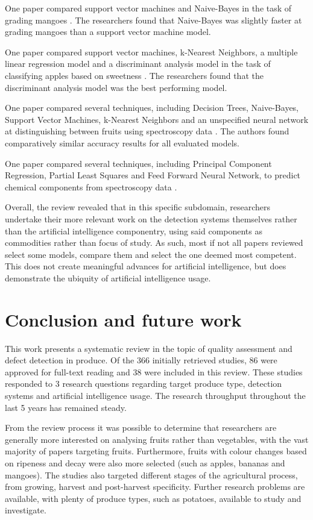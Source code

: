 \documentclass[conference]{IEEEtran}
\begin{document}
One paper compared support vector machines and Naive-Bayes in the task of grading mangoes \cite{Pise2018}. The researchers found that Naive-Bayes was slightly faster at grading mangoes than a support vector machine model.

One paper compared support vector machines, k-Nearest Neighbors, a multiple linear regression model and a discriminant analysis model in the task of classifying apples based on sweetness \cite{Tran2021}. The researchers found that the discriminant analysis model was the best performing model.

One paper compared several techniques, including Decision Trees, Naive-Bayes, Support Vector Machines, k-Nearest Neighbors and an unspecified neural network at distinguishing between fruits using spectroscopy data \cite{Zeb2022}. The authors found comparatively similar accuracy results for all evaluated models.

One paper compared several techniques, including Principal Component Regression, Partial Least Squares and Feed Forward Neural Network, to predict chemical components from spectroscopy data \cite{Rangel2021}.

Overall, the review revealed that in this specific subdomain, researchers undertake their more relevant work on the detection systems themselves rather than the artificial intelligence componentry, using said components as commodities rather than focus of study. As such, most if not all papers reviewed select some models, compare them and select the one deemed most competent. This does not create meaningful advances for artificial intelligence, but does demonstrate the ubiquity of artificial intelligence usage.

\section{Conclusion and future work}
\label{sec:conc}

This work presents a systematic review in the topic of quality assessment and defect detection in produce. Of the 366 initially retrieved studies, 86 were approved for full-text reading and 38 were included in this review. These studies responded to 3 research questions regarding target produce type, detection systems and artificial intelligence usage. The research throughput throughout the last 5 years has remained steady.

From the review process it was possible to determine that researchers are generally more interested on analysing fruits rather than vegetables, with the vast majority of papers targeting fruits. Furthermore, fruits with colour changes based on ripeness and decay were also more selected (such as apples, bananas and mangoes). The studies also targeted different stages of the agricultural process, from growing, harvest and post-harvest specificity. Further research problems are available, with plenty of produce types, such as potatoes, available to study and investigate.
\end{document}
